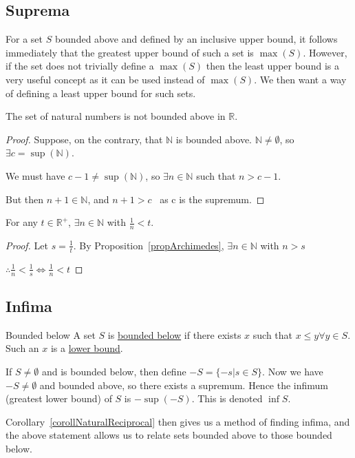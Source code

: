 \documentclass[../Main.tex]{subfiles}
\begin{document}
\subsection{Suprema}
For a set $S$ bounded above and defined by an inclusive upper bound, it follows immediately that the greatest upper bound of such a set is $\max(S)$. However, if the set does not trivially define a $\max(S)$ then the least upper bound is a very useful concept as it can be used instead of $\max(S)$. We then want a way of defining a least upper bound for such sets.
\begin{proposition}
    The set of natural numbers is not bounded above in $\mathbb{R}$.
    \label{propArchimedes}
\end{proposition}
\begin{proof}
    Suppose, on the contrary, that $\mathbb{N}$ is bounded above. $\mathbb{N} \neq \emptyset$, so $\exists c = \sup(\mathbb{N})$.\par
    We must have $c - 1 \neq \sup(\mathbb{N})$, so $\exists n \in \mathbb{N}$ such that $n > c - 1$.\par
    But then $n+1 \in \mathbb{N}$, and $n + 1 > c$ \contradiction~as c is the supremum.
\end{proof}
\begin{corollary}
    For any $t \in \mathbb{R}^+$, $\exists n \in \mathbb{N}$ with $\frac{1}{n} < t$.\par
    \label{corollNaturalReciprocal}
\end{corollary}
\begin{proof}
    Let $s = \frac{1}{t}$. By Proposition~\ref{propArchimedes}, $\exists n \in \mathbb{N}$ with $n > s$\par
    $\therefore \frac{1}{n} < \frac{1}{s} \Leftrightarrow \frac{1}{n} < t$
\end{proof}
\subsection{Infima}
\begin{definition}{Bounded below}
    A set $S$ is \underline{bounded below} if there exists $x$ such that $x \leq y \forall y \in S$. Such an $x$ is a \underline{lower bound}.
\end{definition}
If $S \neq \emptyset$ and is bounded below, then define $-S = \{-s | s \in S\}$. Now we have $-S \neq \emptyset$ and bounded above, so there exists a supremum. Hence the infimum (greatest lower bound) of $S$ is $-\sup(-S)$. This is denoted $\inf{S}$.\par
Corollary~\ref{corollNaturalReciprocal} then gives us a method of finding infima, and the above statement allows us to relate sets bounded above to those bounded below.
\end{document}

